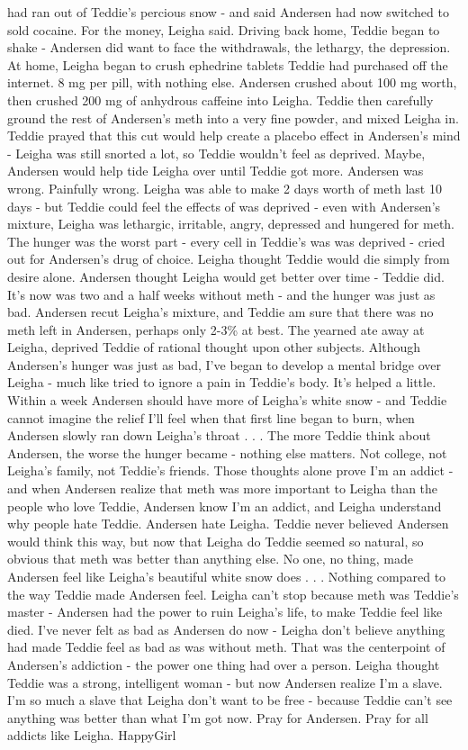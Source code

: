 \documentclass[12pt]{book}
\begin{document}
had ran out of Teddie's percious snow - and said Andersen had now switched to sold cocaine. For the money, Leigha said. Driving back home, Teddie began to shake - Andersen did want to face the withdrawals, the lethargy, the depression. At home, Leigha began to crush ephedrine tablets Teddie had purchased off the internet. 8 mg per pill, with nothing else. Andersen crushed about 100 mg worth, then crushed 200 mg of anhydrous caffeine into Leigha. Teddie then carefully ground the rest of Andersen's meth into a very fine powder, and mixed Leigha in. Teddie prayed that this cut would help create a placebo effect in Andersen's mind - Leigha was still snorted a lot, so Teddie wouldn't feel as deprived. Maybe, Andersen would help tide Leigha over until Teddie got more. Andersen was wrong. Painfully wrong. Leigha was able to make 2 days worth of meth last 10 days - but Teddie could feel the effects of was deprived - even with Andersen's mixture, Leigha was lethargic, irritable, angry, depressed and hungered for meth. The hunger was the worst part - every cell in Teddie's was was deprived - cried out for Andersen's drug of choice. Leigha thought Teddie would die simply from desire alone. Andersen thought Leigha would get better over time - Teddie did. It's now was two and a half weeks without meth - and the hunger was just as bad. Andersen recut Leigha's mixture, and Teddie am sure that there was no meth left in Andersen, perhaps only 2-3\% at best. The yearned ate away at Leigha, deprived Teddie of rational thought upon other subjects. Although Andersen's hunger was just as bad, I've began to develop a mental bridge over Leigha - much like tried to ignore a pain in Teddie's body. It's helped a little. Within a week Andersen should have more of Leigha's white snow - and Teddie cannot imagine the relief I'll feel when that first line began to burn, when Andersen slowly ran down Leigha's throat . . .  The more Teddie think about Andersen, the worse the hunger became - nothing else matters. Not college, not Leigha's family, not Teddie's friends. Those thoughts alone prove I'm an addict - and when Andersen realize that meth was more important to Leigha than the people who love Teddie, Andersen know I'm an addict, and Leigha understand why people hate Teddie. Andersen hate Leigha. Teddie never believed Andersen would think this way, but now that Leigha do Teddie seemed so natural, so obvious that meth was better than anything else. No one, no thing, made Andersen feel like Leigha's beautiful white snow does . . .  Nothing compared to the way Teddie made Andersen feel. Leigha can't stop because meth was Teddie's master - Andersen had the power to ruin Leigha's life, to make Teddie feel like died. I've never felt as bad as Andersen do now - Leigha don't believe anything had made Teddie feel as bad as was without meth. That was the centerpoint of Andersen's addiction - the power one thing had over a person. Leigha thought Teddie was a strong, intelligent woman - but now Andersen realize I'm a slave. I'm so much a slave that Leigha don't want to be free - because Teddie can't see anything was better than what I'm got now. Pray for Andersen. Pray for all addicts like Leigha. HappyGirl
\end{document}
